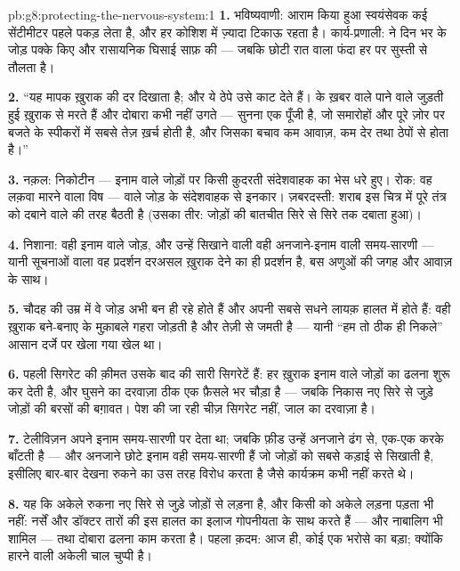 \begin{solution}{pb:g8:protecting-the-nervous-system:1}
\textbf{1.} भविष्यवाणी: आराम किया हुआ स्वयंसेवक कई सेंटीमीटर पहले पकड़
लेता है, और हर कोशिश में ज़्यादा टिकाऊ रहता है। कार्य-प्रणाली:  ने
दिन भर के जोड़ पक्के किए और रासायनिक घिसाई साफ़ की --- जबकि छोटी रात
वाला फंदा हर  पर सुस्ती से तौलता है।

\textbf{2.} ``यह मापक ख़ुराक की दर दिखाता है; और ये ठेपे उसे काट देते
हैं।  के ख़बर वाले पाने वाले जुड़ती हुई ख़ुराक से मरते हैं और दोबारा
कभी नहीं उगते --- सुनना एक पूँजी है, जो समारोहों और पूरे ज़ोर पर बजते
 के स्पीकरों में सबसे तेज़ ख़र्च होती है, और जिसका बचाव कम आवाज़, कम
देर तथा ठेपों से होता है।''

\textbf{3.} नक़ल: निकोटीन --- इनाम वाले जोड़ों पर किसी क़ुदरती संदेशवाहक
का भेस धरे हुए। रोक: वह लक़वा मारने वाला विष ---  वाले जोड़ के
संदेशवाहक से इनकार। ज़बरदस्ती: शराब इस चित्र में पूरे तंत्र को दबाने
वाले की तरह बैठती है (उसका तीर: जोड़ों की बातचीत सिरे से सिरे तक दबाता
हुआ)।

\textbf{4.} निशाना: वही इनाम वाले जोड़, और उन्हें सिखाने वाली वही
अनजाने-इनाम वाली समय-सारणी --- यानी सूचनाओं वाला वह प्रदर्शन दरअसल
ख़ुराक देने का ही प्रदर्शन है, बस अणुओं की जगह  और आवाज़ के साथ।

\textbf{5.} चौदह की उम्र में वे जोड़ अभी बन ही रहे होते हैं और अपनी सबसे
सधने लायक़ हालत में होते हैं: वही ख़ुराक बने-बनाए  के मुक़ाबले
गहरा जोड़ती है और तेज़ी से जमती है --- यानी ``हम तो ठीक ही निकले'' आसान
दर्जे पर खेला गया खेल था।

\textbf{6.} पहली सिगरेट की क़ीमत उसके बाद की सारी सिगरेटें हैं: हर
ख़ुराक इनाम वाले जोड़ों का ढलना शुरू कर देती है, और घुसने का दरवाज़ा
ठीक एक फ़ैसले भर चौड़ा है --- जबकि निकास नए सिरे से जुड़े जोड़ों की
बरसों की बग़ावत। पेश की जा रही चीज़ सिगरेट नहीं, जाल का दरवाज़ा है।

\textbf{7.} टेलीविज़न अपने इनाम समय-सारणी पर देता था; जबकि फ़ीड उन्हें
अनजाने ढंग से, एक-एक करके बाँटती है --- और अनजाने छोटे इनाम वही
समय-सारणी हैं जो जोड़ों को सबसे कड़ाई से सिखाती है, इसीलिए बार-बार देखना
रुकने का उस तरह विरोध करता है जैसे कार्यक्रम कभी नहीं करते थे।

\textbf{8.} यह कि अकेले रुकना नए सिरे से जुड़े जोड़ों से लड़ना है, और
किसी को अकेले लड़ना पड़ता भी नहीं: नर्सें और डॉक्टर तारों की इस हालत का
इलाज गोपनीयता के साथ करते हैं --- और नाबालिग भी शामिल --- तथा दोबारा
ढलना काम करता है। पहला क़दम: आज ही, कोई एक भरोसे का बड़ा; क्योंकि हारने
वाली अकेली चाल चुप्पी है।


\end{solution}
